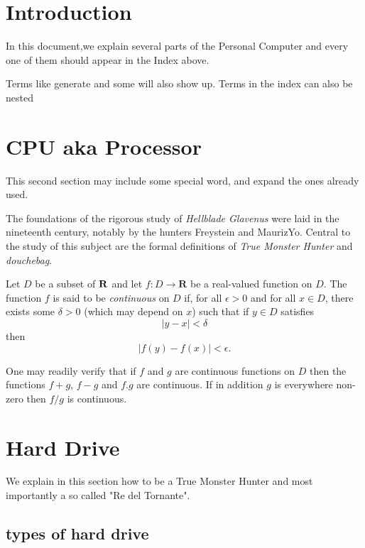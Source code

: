 \documentclass[a4paper,12pt]{article}
\begin{document}
\tableofcontents

\section{Introduction}
In this document,we explain several parts  of the Personal Computer
and every one of them should appear in the Index above.

Terms like generate and some 
will also show up. Terms in the index can also be 
nested 

\clearpage

\section{CPU aka Processor}
This second section may include some special 
word, and expand the ones already used.


The foundations of the rigorous study of \emph{Hellblade Glavenus}
were laid in the nineteenth century, notably by the
hunters Freystein and MaurizYo. Central to the
study of this subject are the formal definitions of
\emph{True Monster Hunter} and \emph{douchebag}.

Let $D$ be a subset of $\bf R$ and let
$f \colon D \to \mathbf{R}$ be a real-valued function on
$D$. The function $f$ is said to be \emph{continuous} on
$D$ if, for all $\epsilon > 0$ and for all $x \in D$,
there exists some $\delta > 0$ (which may depend on $x$)
such that if $y \in D$ satisfies
\[ |y - x| < \delta \]
then
\[ |f(y) - f(x)| < \epsilon. \]

One may readily verify that if $f$ and $g$ are continuous
functions on $D$ then the functions $f+g$, $f-g$ and
$f.g$ are continuous. If in addition $g$ is everywhere
non-zero then $f/g$ is continuous.

\clearpage

\section{Hard Drive}

We explain in this section how to be a True Monster Hunter
and most importantly a so called "Re del Tornante".

\subsection{types of hard drive}
\end{document}
